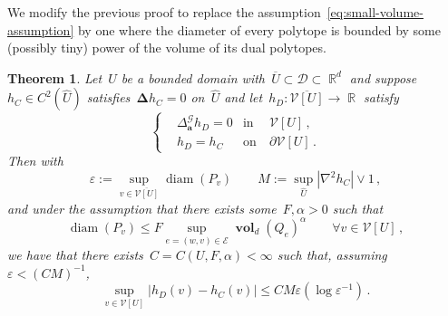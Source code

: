 \documentclass[12pt]{amsart}
\numberwithin{equation}{section}
\DeclareMathOperator{\R}{\mathbb{R}}
\DeclareMathOperator{\diam}{{\mathop{diam}}}
\newtheorem{theorem}{Theorem}[section]
\newcommand{\V}{\mathcal{V}}
\newcommand{\E}{\mathcal{E}}
\newcommand{\eps}{\varepsilon}
\newcommand{\CLap}{\boldsymbol{\Delta}}
\newcommand{\aDelta}{\hyperref[eq:geometric-laplacian]{{\Delta^{\mathcal{G}}_{\cond}}}}
\newcommand{\cond}{\hyperref[eq:geometric-laplacian]{\mathbf{a}}}
\newcommand{\GCU}{\hyperref[eq:graph-closure]{\widehat{U}}}
\newcommand{\Qe}{\hyperref[eq:qeset]{Q_e}}
\DeclareMathOperator{\vol}{\mathbf{vol}}
\begin{document}
We modify the previous proof to replace the assumption~\eqref{eq:small-volume-assumption} by one
where the diameter of every polytope is bounded by some (possibly tiny) power of the volume of its dual polytopes. 
\begin{theorem}
	\label{theorem:generaldim-decay}
	Let~$U$ be a bounded domain with~$\overline{U} \subset \mathcal{D} \subset \R^d$ and suppose~$h_C \in C^{2}(\GCU)$ satisfies~$\CLap h_C = 0$ on~$\GCU$ and let~$h_D: \overline{\V[U]} \to \R$ satisfy 
	\[
	\left\{
	\begin{aligned}
		&  \aDelta h_D = 0 & \mbox{in} & \ \V[U] \,,
		\\
		& h_D = h_C & \mbox{on} & \  \partial \V[U] \, . 
	\end{aligned}
	\right.
	\]
	Then with
	\[
	\eps := \sup_{v \in \overline{\V[U]}} \diam(P_v) \quad \quad M := \sup_{\GCU} |\nabla^2 h_C| \vee 1 \, , 
	\]
	and under the assumption that there exists some~$F, \alpha > 0$ such that
	\begin{equation}
		\label{eq:decay-of-stuff}
		\diam(P_v) \leq  F \sup_{e = (w,v) \in \E} \vol_{d}(\Qe)^{\alpha} \qquad \forall v \in \V[U] \, ,  
	\end{equation}
	we have that there exists~$C=C(U, F, \alpha) < \infty$ such that, assuming~{$\eps  < (C M)^{-1}$},
	\begin{equation} 
		\label{eq:full-bound-decay-of-stuff}
		\sup_{v \in \V[U]} | h_D(v) - h_C(v) | \leq {C M \eps (\log \eps^{-1})}  \, . 
	\end{equation}
\end{theorem}
\end{document}
